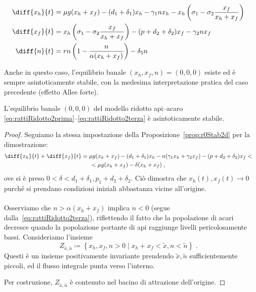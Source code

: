 \begin{align}
    \diff{x_h}{t} &= \mu g( x_h + x_f ) - (d_1 + \delta_1) x_h - \gamma_1 n x_h
        - x_h \left( \sigma_1 - \sigma_2 \frac{x_f}{x_h + x_f} \right)
        \label{eq:rattiRidotto2prima}
    \\
    \diff{x_f}{t} &= x_h \left( \sigma_1 - \sigma_2 \frac{x_f}{x_h + x_f} \right) - (p + d_2 + \delta_2) x_f
        - \gamma_2 n x_f
        \label{eq:rattiRidotto2seconda}
    \\
    \diff{n}{t} &= rn \left( 1 - \frac{n}{ \alpha (x_h + x_f) } \right) - \delta_5 n
        \label{eq:rattiRidotto2terza}
\end{align}

Anche in questo caso, l'equilibrio banale $(x_h, x_f, n)=(0,0,0)$ esiste ed è sempre asintoticamente stabile, con la medesima interpretazione pratica del caso precedente (effetto Allee forte).

\begin{proposizione}
L'equilibrio banale $(0,0,0)$ del modello ridotto
api--acaro \eqref{eq:rattiRidotto2prima}--\eqref{eq:rattiRidotto2terza}
è asintoticamente stabile.
\end{proposizione}

\begin{proof}
Seguiamo la stessa impostazione della Proposizione~\ref{prop:r0Stab2d} per la dimostrazione:
\begin{multline*}
\diff{x_h}{t} + \diff{x_f}{t} = \mu g (x_h + x_f) - (d_1 +\delta_1) x_h
- n( \gamma_1 x_h + \gamma_2 x_f ) - (p + d_2 + \delta_2) x_f < \\
< \mu g(x_h +x_f) - \delta (x_h + x_f) \; ,
\end{multline*}
ove si è preso $0< \delta < d_1 + \delta_1 , p_1 + d_2 + \delta_2$.
Ciò dimostra che $x_h(t), x_f(t) \to 0$ purché si prendano condizioni iniziali abbastanza vicine all'origine.

\paragraph{}
Osserviamo che $n > \alpha (x_h + x_f)$ implica $\dot{n} <0$ (segue dalla~\ref{eq:rattiRidotto2terza}),
riflettendo il fatto che la popolazione di acari decresce quando la popolazione portante di api
raggiunge livelli pericolosamente bassi. Consideriamo l'insieme
$$Z_{\tilde{x}, \tilde{n}} \coloneq \left\{ x_h, x_f, n > 0 \; | \; x_h + x_f < \tilde{x}, n < \tilde{n} \right\} \; .$$
Questi è un insieme positivamente invariante prendendo $\tilde{x}, \tilde{n}$ sufficientemente piccoli,
ed il flusso integrale punta verso l'interno.

Per costruzione, $Z_{\tilde{x}, \tilde{n}}$ è contenuto nel bacino di attrazione dell'origine.
\end{proof}

